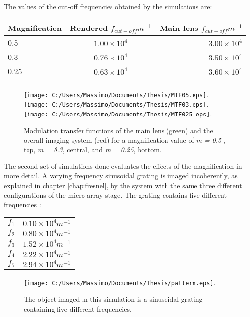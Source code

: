 The values of the cut-off frequencies obtained by the simulations are:
\begin{center}
	\begin{tabular}{l|c|r}
		Magnification & Rendered $f_{cut-off}m^{-1}$ & Main lens $f_{cut-off}m^{-1}$\\ \hline
		0.5 & $1.00 \times 10^{4}$ &  $3.00 \times 10^{4}$ \\ \hline
		0.3 & $0.76 \times 10^{4}$ &  $3.50 \times 10^{4}$ \\ \hline
		0.25 & $0.63\times 10^{4}$ &  $3.60\times 10^{4}$  \\ 
		\label{tab:6}
	\end{tabular}
\end{center} 
\begin{figure}[H]
	\centering
	\texttt{[image: C:/Users/Massimo/Documents/Thesis/MTF05.eps]}.
	\texttt{[image: C:/Users/Massimo/Documents/Thesis/MTF03.eps]}.
	\texttt{[image: C:/Users/Massimo/Documents/Thesis/MTF025.eps]}.
	\caption{\label{fig:MTF} Modulation transfer functions of the main lens (green) and the overall imaging system (red) for a magnification value of \textit{m = 0.5} , top, \textit{m = 0.3}, central, and \textit{m = 0.25}, bottom.}
\end{figure}
The second set of simulations done evaluates the effects of the magnification in more detail. A varying frequency sinusoidal grating is imaged incoherently, as explained in chapter \ref{chap:fresnel}, by the system with the same three different configurations of the micro array stage. The grating contains five different frequencies :
\begin{center}
\begin{tabular}{l|r}
	\centering
	$f_1$ & $0.10\times 10^4 m^{-1}$ \\
	$f_2$ & $0.80\times 10^4 m^{-1}$ \\
	$f_3$ & $1.52\times 10^4 m^{-1}$ \\
	$f_4$ & $2.22\times 10^4 m^{-1}$ \\
	$f_5$ & $2.94\times 10^4 m^{-1}$ \\
\end{tabular}
\end{center}
\begin{figure}[H]
	\centering
	\texttt{[image: C:/Users/Massimo/Documents/Thesis/pattern.eps]}.
	\caption{\label{fig:pattern} The object imaged in this simulation is a sinusoidal grating containing five different frequencies. }
\end{figure}
